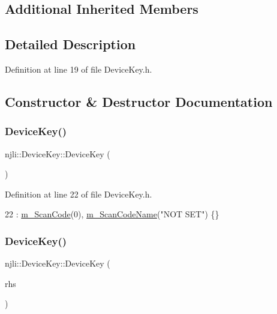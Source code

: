 \subsection*{Additional Inherited Members}


\subsection{Detailed Description}


Definition at line 19 of file Device\+Key.\+h.



\subsection{Constructor \& Destructor Documentation}
\mbox{\label{classnjli_1_1_device_key_a6c0ce8411a06487b2d23b6d5a527aa25}} 
\subsubsection{\texorpdfstring{Device\+Key()}{DeviceKey()}\hspace{0.1cm}{\footnotesize\ttfamily [1/3]}}
{\footnotesize\ttfamily njli\+::\+Device\+Key\+::\+Device\+Key (\begin{DoxyParamCaption}{ }\end{DoxyParamCaption})\hspace{0.3cm}{\ttfamily [inline]}}



Definition at line 22 of file Device\+Key.\+h.


\begin{DoxyCode}
22 : \mbox{\hyperlink{classnjli_1_1_device_key_a326eb4f8f1b7abc2b916c8ed11d8dca6}{m\_ScanCode}}(0), \mbox{\hyperlink{classnjli_1_1_device_key_ac619bfe3e166c9f9ddda4e308f4315d9}{m\_ScanCodeName}}(\textcolor{stringliteral}{"NOT SET"}) \{\}
\end{DoxyCode}
\mbox{\label{classnjli_1_1_device_key_a97f655c0ede86cf0fe3806108517dbad}} 
\subsubsection{\texorpdfstring{Device\+Key()}{DeviceKey()}\hspace{0.1cm}{\footnotesize\ttfamily [2/3]}}
{\footnotesize\ttfamily njli\+::\+Device\+Key\+::\+Device\+Key (\begin{DoxyParamCaption}\item[{const \mbox{\hyperlink{classnjli_1_1_device_key}{Device\+Key}} \&}]{rhs }\end{DoxyParamCaption})\hspace{0.3cm}{\ttfamily [inline]}}



